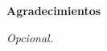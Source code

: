 \newpage
\begin{center}
{\bf \Huge Agradecimientos}
\end{center}
\vspace{1cm}
\setlength{\baselineskip}{0.8cm}

\begin{flushright}
\textit{Opcional.}
\end{flushright}

